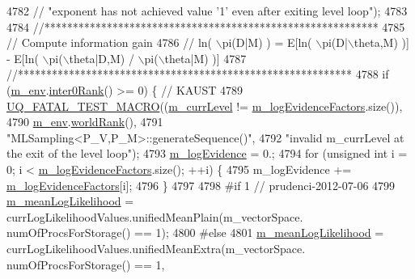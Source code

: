 \begin{DoxyCode}
{{{{4782   \textcolor{comment}{//                    "exponent has not achieved value '1' even after exiting level loop");}
4783 
4784   \textcolor{comment}{//***********************************************************}
4785   \textcolor{comment}{// Compute information gain}
4786   \textcolor{comment}{// ln( \(\backslash\)pi(D|M) ) = E[ln( \(\backslash\)pi(D|\(\backslash\)theta,M) )] - E[ln( \(\backslash\)pi(\(\backslash\)theta|D,M) / \(\backslash\)pi(\(\backslash\)theta|M) )]}
4787   \textcolor{comment}{//***********************************************************}
4788   \textcolor{keywordflow}{if} (\hyperlink{class_q_u_e_s_o_1_1_m_l_sampling_a13f1ca4fe9f94822fe572a743eaced1d}{m\_env}.\hyperlink{class_q_u_e_s_o_1_1_base_environment_ae106b5bb8a80b655b88b3a26b1e7c185}{inter0Rank}() >= 0) \{ \textcolor{comment}{// KAUST}
4789     \hyperlink{_defines_8h_a56d63d18d0a6d45757de47fcc06f574d}{UQ\_FATAL\_TEST\_MACRO}((\hyperlink{class_q_u_e_s_o_1_1_m_l_sampling_af9416874c856e50f3b35270e801f17e4}{m\_currLevel} != 
      \hyperlink{class_q_u_e_s_o_1_1_m_l_sampling_a75f2ceab4a2c6774b3fa07d74221dbf3}{m\_logEvidenceFactors}.size()),
4790                         \hyperlink{class_q_u_e_s_o_1_1_m_l_sampling_a13f1ca4fe9f94822fe572a743eaced1d}{m\_env}.\hyperlink{class_q_u_e_s_o_1_1_base_environment_a78b57112bbd0e6dd0e8afec00b40ffa7}{worldRank}(),
4791                         \textcolor{stringliteral}{"MLSampling<P\_V,P\_M>::generateSequence()"},
4792                         \textcolor{stringliteral}{"invalid m\_currLevel at the exit of the level loop"});
4793     \hyperlink{class_q_u_e_s_o_1_1_m_l_sampling_afad63c42dccb1518319bf677f2bffde0}{m\_logEvidence} = 0.;
4794     \textcolor{keywordflow}{for} (\textcolor{keywordtype}{unsigned} \textcolor{keywordtype}{int} i = 0; i < \hyperlink{class_q_u_e_s_o_1_1_m_l_sampling_a75f2ceab4a2c6774b3fa07d74221dbf3}{m\_logEvidenceFactors}.size(); ++i) \{
4795       m\_logEvidence += \hyperlink{class_q_u_e_s_o_1_1_m_l_sampling_a75f2ceab4a2c6774b3fa07d74221dbf3}{m\_logEvidenceFactors}[i];
4796     \}
4797 
4798 \textcolor{preprocessor}{#if 1 // prudenci-2012-07-06}
4799 \textcolor{preprocessor}{}    \hyperlink{class_q_u_e_s_o_1_1_m_l_sampling_aec4229773274b58e3eaa49a77738389f}{m\_meanLogLikelihood} = currLogLikelihoodValues.unifiedMeanPlain(m\_vectorSpace.
      numOfProcsForStorage() == 1);
4800 \textcolor{preprocessor}{#else}
4801 \textcolor{preprocessor}{}    \hyperlink{class_q_u_e_s_o_1_1_m_l_sampling_aec4229773274b58e3eaa49a77738389f}{m\_meanLogLikelihood} = currLogLikelihoodValues.unifiedMeanExtra(m\_vectorSpace.
      numOfProcsForStorage() == 1,
}}}}
\end{DoxyCode}
